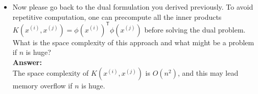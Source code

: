 \begin{enumerate}
\begin{itemize}
\item Now please go back to the dual formulation you derived previously. To avoid repetitive computation, one can precompute all the inner products $K(x^{(i)},x^{(j)})=\phi(x^{(i)})^\mathsf{T}\phi(x^{(j)})$ before solving the dual problem. What is the space complexity of this approach and what might be a problem if $n$ is huge?
\\\textbf{Answer:}\\
The space complexity of $K(x^{(i)},x^{(j)})$ is $O(n^2)$, and this may lead memory overflow if $n$ is huge.

\end{itemize}
\end{enumerate}

\newpage

